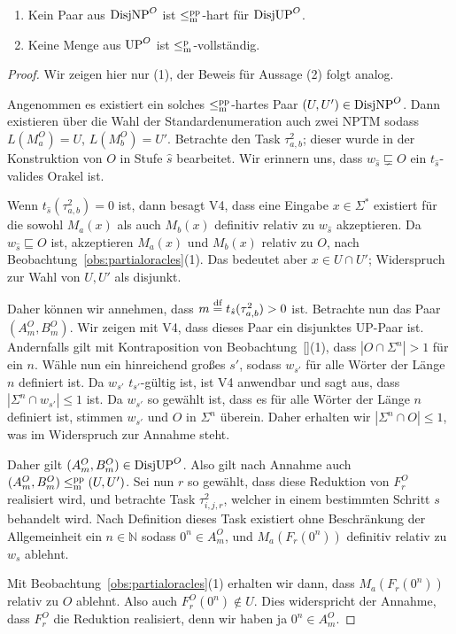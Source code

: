 \begin{claim}
    \begin{enumerate}
        \item Kein Paar aus $\mathrm{DisjNP}^O$ ist $\leq_\mathrm{m}^\mathrm{pp}$-hart für $\mathrm{DisjUP}^O$.
        \item Keine Menge aus $\mathrm{UP}^O$ ist $\leq_\mathrm{m}^\mathrm{p}$-vollständig.
    \end{enumerate}
\end{claim}
\begin{proof}
    Wir zeigen hier nur (1), der Beweis für Aussage (2) folgt analog.

    Angenommen es existiert ein solches $\leq_\mathrm{m}^\mathrm{pp}$-hartes Paar $(U, U')\in\mathrm{DisjNP}^O$.
    Dann existieren über die Wahl der Standardenumeration auch zwei NPTM sodass $L(M_a^O)=U$, $L(M_b^O)=U'$.
    Betrachte den Task $\tau^2_{a,b}$; dieser wurde in der Konstruktion von $O$ in Stufe $\hat{s}$ bearbeitet.
    Wir erinnern uns, dass $w_{\hat{s}}\sqsubsetneq O$ ein $t_{\hat{s}}$-valides Orakel ist.

    Wenn $t_{\hat{s}}(\tau^2_{a,b})=0$ ist, dann besagt V4, dass eine Eingabe $x\in\Sigma^*$ existiert für die sowohl $M_a(x)$ als auch $M_b(x)$ definitiv relativ zu $w_{\hat{s}}$ akzeptieren. Da $w_{\hat{s}}\sqsubseteq O$ ist, akzeptieren $M_a(x)$ und $M_b(x)$ relativ zu $O$, nach Beobachtung~\ref{obs:partialoracles}(1).
    Das bedeutet aber $x\in U\cap U'$; Widerspruch zur Wahl von $U, U'$ als disjunkt.

    Daher können wir annehmen, dass $m\stackrel{\text{df}}{=}  t_{\hat{s}}(\tau^2_{a,b})>0$ ist.
    Betrachte nun das Paar $(A^O_m, B^O_m)$. Wir zeigen mit V4, dass dieses Paar ein disjunktes UP-Paar ist.
    Andernfalls gilt mit Kontraposition von Beobachtung~\ref{}(1), dass $|O\cap\Sigma^n|>1$ für ein $n$.
    Wähle nun ein hinreichend großes $s'$, sodass $w_{s'}$ für alle Wörter der Länge $n$ definiert ist.
    Da $w_{s'}$ $t_{s'}$-gültig ist, ist V4 anwendbar und sagt aus, dass $|\Sigma^n\cap w_{s'}|\leq 1$ ist. Da $w_{s'}$ so gewählt ist, dass es für alle Wörter der Länge $n$ definiert ist, stimmen $w_{s'}$ und $O$ in $\Sigma^n$ überein. Daher erhalten wir $|\Sigma^n\cap O|\leq 1$, was im Widerspruch zur Annahme steht.

    Daher gilt $(A^O_m, B^O_m)\in\mathrm{DisjUP}^O$. Also gilt nach Annahme auch $(A^O_m, B^O_m) \leq_\mathrm{m}^\mathrm{pp} (U, U')$.
    Sei nun $r$ so gewählt, dass diese Reduktion von $F^O_r$ realisiert wird, und betrachte Task  $\tau^2_{i,j,r}$, welcher in einem bestimmten Schritt $s$ behandelt wird.
    Nach Definition dieses Task existiert ohne Beschränkung der Allgemeinheit ein $n\in\mathbb N$ sodass $0^n\in A_m^O$, und $M_a(F_r(0^n))$ definitiv relativ zu $w_s$ ablehnt.

    Mit Beobachtung~\ref{obs:partialoracles}(1) erhalten wir dann, dass $M_a(F_r(0^n))$ relativ zu $O$ ablehnt. Also auch $F^O_r(0^n)\not\in U$. Dies widerspricht der Annahme, dass $F_r^O$ die Reduktion realisiert, denn wir haben ja $0^n\in A_m^O$.
\end{proof}

